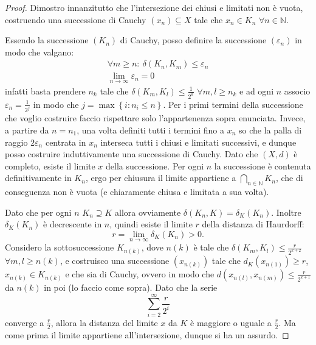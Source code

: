 \begin{proof}
Dimostro innanzitutto che l'intersezione dei chiusi e limitati non è vuota, costruendo una successione di Cauchy $\left (x_n\right ) \subseteq X$ tale che $x_n \in K_n$ $ \forall n \in \mathbb{N}$. 

Essendo la successione $\left(K_n\right)$ di Cauchy, posso definire la successione $(\varepsilon_n)$ in modo che valgano:
\begin{gather*}
	\forall m\geq n:\ \delta \left ( K_n, K_m \right )\leq \varepsilon_n \\
	\lim_{n \to \infty}\varepsilon_n =0
\end{gather*}
infatti basta prendere $n_k$ tale che $\delta \left ( K_m, K_l \right )\leq \frac{1}{2^k}$ $\forall m,l\geq n_k$ e ad ogni $n$ associo $\varepsilon_n=\frac{1}{2^j}$ in modo che $j=\max { \left \{ i:n_i \leq n \right \} }$. Per i primi termini della successione che voglio costruire faccio rispettare solo l'appartenenza sopra enunciata. Invece, a partire da $n=n_1$, una volta definiti tutti i termini fino a $x_n$ so che la palla di raggio $2\varepsilon_n$ centrata in $x_n$ interseca tutti i chiusi e limitati successivi, e dunque posso costruire induttivamente una successione di Cauchy. Dato che $\left (X,d\right )$ è completo, esiste il limite $x$ della successione. Per ogni $n$ la successione è contenuta definitivamente in $K_n$, ergo per chiusura il limite appartiene a $ \bigcap_{n \in \mathbb{N}}K_n $, che di conseguenza non è vuota (e chiaramente chiusa e limitata a sua volta).

Dato che per ogni $n$ $K_n\supseteq K$ allora ovviamente $\delta\left  (K_n,K\right )=\delta_{K}\left (K_n\right )$. Inoltre $\delta_{K}\left (K_n\right )$ è decrescente in $n$, quindi esiste il limite $r$ della distanza di Haurdorff:
\begin{equation*}
r=\lim_{n \to \infty}\delta_{K}\left (K_n\right )>0.
\end{equation*}
Considero la sottosuccessione $K_{n(k)}$, dove $n(k)$ è tale che $\delta \left ( K_m, K_l \right )\leq \frac{r}{2^{k+2}}$ $\forall m,l\geq n(k)$, e costruisco una successione $\left ( x_{n(k)} \right )$ tale che $d_{K} \left (x_{n(1)} \right )\geq r$, $ x_{n(k)} \in K_{n(k)}$ e che sia di Cauchy, ovvero in modo che $d \left ( x_{n(l)}, x_{n(m)} \right )\leq \frac{r}{2^{k+1}}$ da $n(k)$ in poi (lo faccio come sopra). Dato che la serie
\begin{equation*}
\sum_{i=2}^{\infty} \frac{r}{2^i}
\end{equation*}
converge a $\frac{r}{2}$, allora la distanza del limite $x$ da $K$ è maggiore o uguale a $\frac{r}{2}$. Ma come prima il limite appartiene all'intersezione, dunque si ha un assurdo.
\end{proof}

